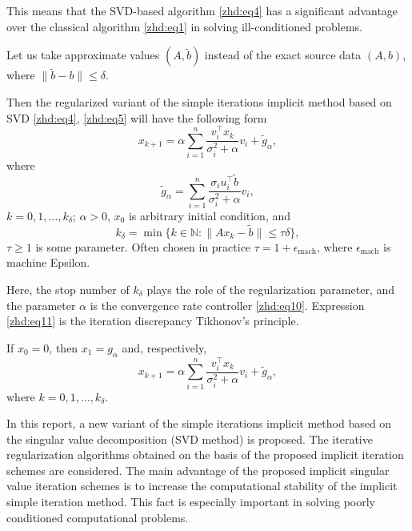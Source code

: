 This means that the SVD-based algorithm \eqref{zhd:eq4} has a significant advantage over the classical algorithm \eqref{zhd:eq1} in solving ill-conditioned problems.

\smallskip

Let us take approximate values $(A, \tilde{b})$ instead of the exact source data $(A, b)$, where $\|\tilde{b}-b\|\leq\delta$.

Then the regularized variant of the simple iterations implicit method based on SVD  \eqref{zhd:eq4}, \eqref{zhd:eq5} will have the following form
\begin{equation}
\label{zhd:eq10}
x_{k+1}=\alpha\sum_{i=1}^n\frac{v_i^\top  x_k}{\sigma_i^2+\alpha}v_i+\tilde{g}_{\alpha},   
\end{equation}
where
$$ 
\tilde{g}_\alpha=\sum_{i=1}^n\frac{\sigma_i u_i^\top \tilde{b}}{\sigma_i^2+\alpha}v_i,
$$
$k=0, 1, \dots, k_\delta$; $\alpha>0$, $x_0$ is arbitrary initial condition, and
\begin{equation}
\label{zhd:eq11}
k_\delta=\min\{k\in\mathbb{N}: \|Ax_k-\tilde{b}\|\leq\tau\delta\}, 
\end{equation}
$\tau\geq 1$ is some parameter. Often chosen in practice $\tau=1+\epsilon_\mathrm{mach}$, where $\epsilon_\mathrm{mach}$ is machine Epsilon.

Here, the stop number of $k_\delta$ plays the role of the regularization parameter, and the parameter $\alpha$ is the convergence rate controller \eqref{zhd:eq10}. Expression \eqref{zhd:eq11} is the iteration discrepancy Tikhonov's principle.

If $x_0=0$, then $x_1=g_\alpha$ and, respectively,
$$ 
x_{k+1}=\alpha\sum_{i=1}^n\frac{v_i^\top  x_k}{\sigma_i^2+\alpha}v_i+\tilde{g}_{\alpha},
$$
where $k=0, 1, \dots, k_\delta$.

\smallskip

In this report, a new variant of the simple iterations implicit method based on the singular value decomposition (SVD method) is proposed. The iterative regularization algorithms obtained on the basis of the proposed implicit iteration schemes are considered. The main advantage of the proposed implicit singular value iteration schemes is to increase the computational stability of the implicit simple iteration method. This fact is especially important in solving poorly conditioned computational problems.
\smallskip 
 


